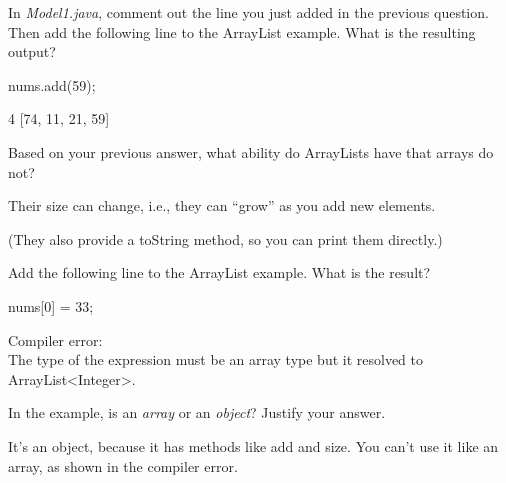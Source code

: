 \Q In \textit{Model1.java}, comment out the line you just added in the previous question.
Then add the following line to the ArrayList example.
What is the resulting output?

\begin{javalst}
nums.add(59);
\end{javalst}

\begin{answer}
\begin{javaans}
4
[74, 11, 21, 59]
\end{javaans}
\end{answer}


\Q \label{key1}
Based on your previous answer, what ability do ArrayLists have that arrays do not?

\begin{answer}
Their size can change, i.e., they can ``grow'' as you add new elements.

(They also provide a toString method, so you can print them directly.)
\end{answer}


\Q Add the following line to the ArrayList example. What is the result?

\begin{javalst}
nums[0] = 33;
\end{javalst}

\begin{answer}
Compiler error: \\
The type of the expression must be an array type but it resolved to ArrayList<Integer>.
\end{answer}


\Q In the  example, is  an \textit{array} or an \textit{object}? Justify your answer.

\begin{answer}
It's an object, because it has methods like add and size.
You can't use it like an array, as shown in the compiler error.
\end{answer}

